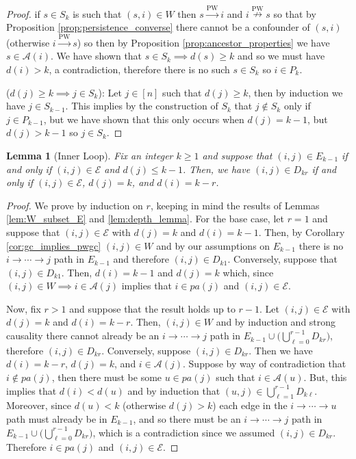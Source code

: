 \documentclass{statsoc}
\def\pwgc{\overset{\text{PW}}{\rightarrow}}  %
\def\npwgc{\overset{\text{PW}}{\nrightarrow}}  %
\def\gcge{\mathcal{E}}  %
\newcommand{\pa}[1]{pa(#1)}  %
\newcommand{\anc}[1]{\mathcal{A}(#1)}  %
\newcommand{\gcgpath}[2]{#1 \rightarrow \cdots \rightarrow #2}  %
\newtheorem{lemma}{Lemma}
\begin{document}
\begin{proof}
  if $s \in S_k$ is such that $(s, i) \in W$ then $s \pwgc i$ and
  $i \npwgc s$ so that by Proposition \ref{prop:persistence_converse}
  there cannot be a confounder of $(s, i)$ (otherwise $i \pwgc s$) so
  then by Proposition \ref{prop:ancestor_properties} we have
  $s \in \anc{i}$.  We have shown that $s \in S_k \implies d(s) \ge k$
  and so we must have $d(i) > k$, a contradiction, therefore there is
  no such $s \in S_k$ so $i \in P_k$.

  ($d(j) \ge k \implies j \in S_k$): Let $j \in [n]$ such that
  $d(j) \ge k$, then by induction we have $j \in S_{k - 1}$.  This
  implies by the construction of $S_k$ that $j \not\in S_k$ only if
  $j \in P_{k - 1}$, but we have shown that this only occurs when
  $d(j) = k - 1$, but $d(j) > k - 1$ so $j \in S_k$.
\end{proof}

\begin{lemma}[Inner Loop]
  \label{lem:inner_loop_lemma}
  Fix an integer $k \ge 1$ and suppose that $(i, j) \in E_{k - 1}$ if
  and only if $(i, j) \in \gcge$ and $d(j) \le k - 1$.  Then, we have
  $(i, j) \in D_{kr}$ if and only if $(i, j) \in \gcge $, $d(j) = k$,
  and $d(i) = k - r$.
\end{lemma}
\begin{proof}
  We prove by induction on $r$, keeping in mind the results of Lemmas
  \ref{lem:W_subset_E} and \ref{lem:depth_lemma}.  For the base case,
  let $r = 1$ and suppose that $(i, j) \in \gcge$ with $d(j) = k$ and
  $d(i) = k - 1$.  Then, by Corollary \ref{cor:gc_implies_pwgc}
  $(i, j) \in W$ and by our assumptions on $E_{k - 1}$ there is no
  $\gcgpath{i}{j}$ path in $E_{k - 1}$ and therefore
  $(i, j) \in D_{k1}$.  Conversely, suppose that $(i, j) \in D_{k1}$.
  Then, $d(i) = k - 1$ and $d(j) = k$ which, since
  $(i, j) \in W \implies i \in \anc{j}$ implies that $i \in \pa{j}$
  and $(i, j) \in \gcge$.

  Now, fix $r > 1$ and suppose that the result holds up to $r - 1$.
  Let $(i, j) \in \gcge$ with $d(j) = k$ and $d(i) = k - r$.  Then,
  $(i, j) \in W$ and by induction and strong causality there cannot
  already be an $\gcgpath{i}{j}$ path in
  $E_{k - 1} \cup \big(\bigcup_{\ell = 0}^{r - 1} D_{kr}\big)$,
  therefore $(i, j) \in D_{kr}$.  Conversely, suppose
  $(i, j) \in D_{kr}$.  Then we have $d(i) = k - r$, $d(j) = k$, and
  $i \in \anc{j}$.  Suppose by way of contradiction that
  $i \not\in \pa{j}$, then there must be some $u \in \pa{j}$ such that
  $i \in \anc{u}$.  But, this implies that $d(i) < d(u)$ and by
  induction that $(u, j) \in \bigcup_{\ell = 1}^{r - 1}D_{k\ell}$.
  Moreover, since $d(u) < k$ (otherwise $d(j) > k$) each edge in
  the $\gcgpath{i}{u}$ path must already be in $E_{k - 1}$, and so
  there must be an $\gcgpath{i}{j}$ path in
  $E_{k - 1}\cup\big(\bigcup_{\ell = 0}^{r - 1}D_{kr}\big)$, which is
  a contradiction since we assumed $(i, j) \in D_{kr}$.  Therefore
  $i \in \pa{j}$ and $(i, j) \in \gcge$.
\end{proof}
\end{document}
